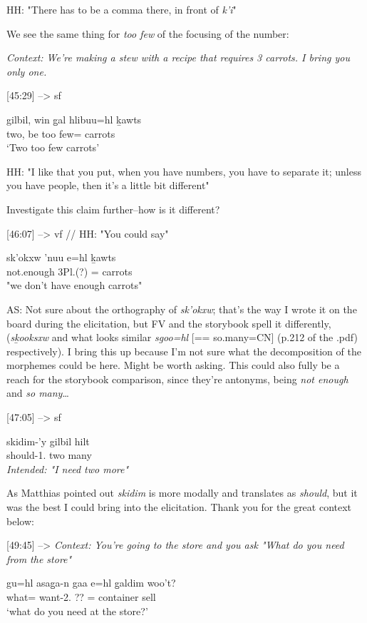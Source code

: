 \documentclass{article}
\begin{document}
HH: "There has to be a comma there, in front of \textit{k'i}"

We see the same thing for \textit{too few} of the focusing of the number:

\textit{Context: We're making a stew with a recipe that requires 3 carrots. I bring you only one.}

[45:29] --> sf
\begin{exe}
\ex \gll gilbil, win g̱al hlibuu=hl ḵawts\\
two, be too few=\Cn{} carrots\\
`Two too few carrots'
\end{exe}

HH: "I like that you put, when you have numbers, you have to separate it; unless you have people, then it's a little bit different"

Investigate this claim further--how is it different?

[46:07] --> vf // HH: "You could say"
\begin{exe}
\ex \gll sk'okxw 'nuu e=hl ḵawts\\
not.enough 3Pl.\Iii{}(?) \Prep{}=\Cn{} carrots\\
"we don't have enough carrots"
\end{exe}

AS: Not sure about the orthography of \textit{sk'okxw}; that's the way I wrote it on the board during the elicitation, but FV and the storybook spell it differently, (\textit{sḵooksxw} and what looks similar \textit{sgoo=hl} [== so.many=CN] (p.212 of the .pdf) respectively). I bring this up because I'm not sure what the decomposition of the morphemes could be here. Might be worth asking.
This could also fully be a reach for the storybook comparison, since they're antonyms, being \textit{not enough} and \textit{so many}\dots

[47:05] --> sf
\begin{exe}
\ex \gll skidim-'y gilbil hilt\\
should-1.\Ii{} two many\\
\textit{Intended: "I need two more"}
\end{exe}

As Matthias pointed out \textit{skidim} is more modally and translates as \textit{should}, but it was the best I could bring into the elicitation. Thank you for the great context below:

[49:45] --> \textit{Context: You're going to the store and you ask "What do you need from the store"}
\begin{exe}
\ex \gll gu=hl asag̱a-n gaa e=hl g̱aldim woo't?\\
what=\Cn{} want-2.\Ii{} ?? \Prep{}=\Cn{} container sell \\
`what do you need at the store?'
\end{exe}
\end{document}
